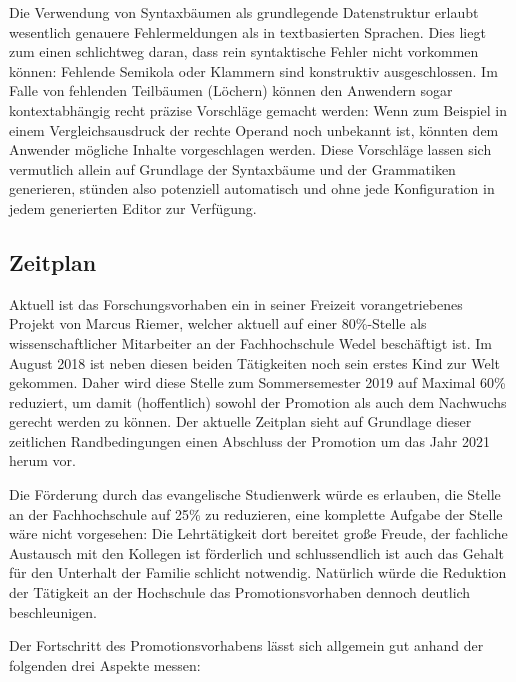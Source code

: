 \documentclass[paper=a4,fontsize=11pt,parskip=half]{scrartcl}
\begin{document}
Die Verwendung von Syntaxbäumen als grundlegende Datenstruktur erlaubt wesentlich genauere Fehlermeldungen als in textbasierten Sprachen. Dies liegt zum einen schlichtweg daran, dass rein syntaktische Fehler nicht vorkommen können: Fehlende Semikola oder Klammern sind konstruktiv ausgeschlossen. Im Falle von fehlenden Teilbäumen (Löchern) können den Anwendern sogar kontextabhängig recht präzise Vorschläge gemacht werden: Wenn zum Beispiel in einem Vergleichsausdruck der rechte Operand noch unbekannt ist, könnten dem Anwender mögliche Inhalte vorgeschlagen werden. Diese Vorschläge lassen sich vermutlich allein auf Grundlage der Syntaxbäume und der Grammatiken generieren, stünden also potenziell automatisch und ohne jede Konfiguration in jedem generierten Editor zur Verfügung.

\subsection{Zeitplan}

Aktuell ist das Forschungsvorhaben ein in seiner Freizeit vorangetriebenes Projekt von Marcus Riemer, welcher aktuell auf einer 80\%-Stelle als wissenschaftlicher Mitarbeiter an der Fachhochschule Wedel beschäftigt ist. Im August 2018 ist neben diesen beiden Tätigkeiten noch sein erstes Kind zur Welt gekommen. Daher wird diese Stelle zum Sommersemester 2019 auf Maximal 60\% reduziert, um damit (hoffentlich) sowohl der Promotion als auch dem Nachwuchs gerecht werden zu können. Der aktuelle Zeitplan sieht auf Grundlage dieser zeitlichen Randbedingungen einen Abschluss der Promotion um das Jahr 2021 herum vor.

Die Förderung durch das evangelische Studienwerk würde es erlauben, die Stelle an der Fachhochschule auf 25\% zu reduzieren, eine komplette Aufgabe der Stelle wäre nicht vorgesehen: Die Lehrtätigkeit dort bereitet große Freude, der fachliche Austausch mit den Kollegen ist förderlich und schlussendlich ist auch das Gehalt für den Unterhalt der Familie schlicht notwendig. Natürlich würde die Reduktion der Tätigkeit an der Hochschule das Promotionsvorhaben dennoch deutlich beschleunigen.

Der Fortschritt des Promotionsvorhabens lässt sich allgemein gut anhand der folgenden drei Aspekte messen:
\end{document}
